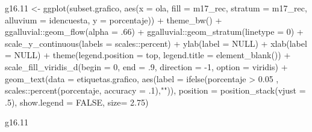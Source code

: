 \documentclass[
  12pt,
]{book}
\newenvironment{Shaded}{\begin{snugshade}}{\end{snugshade}}
\newcommand{\AttributeTok}[1]{\textcolor[rgb]{0.77,0.63,0.00}{#1}}
\newcommand{\ConstantTok}[1]{\textcolor[rgb]{0.00,0.00,0.00}{#1}}
\newcommand{\DecValTok}[1]{\textcolor[rgb]{0.00,0.00,0.81}{#1}}
\newcommand{\FloatTok}[1]{\textcolor[rgb]{0.00,0.00,0.81}{#1}}
\newcommand{\FunctionTok}[1]{\textcolor[rgb]{0.00,0.00,0.00}{#1}}
\newcommand{\NormalTok}[1]{#1}
\newcommand{\OtherTok}[1]{\textcolor[rgb]{0.56,0.35,0.01}{#1}}
\newcommand{\SpecialCharTok}[1]{\textcolor[rgb]{0.00,0.00,0.00}{#1}}
\newcommand{\StringTok}[1]{\textcolor[rgb]{0.31,0.60,0.02}{#1}}
\begin{document}
\begin{Shaded}
\begin{Highlighting}[]
\NormalTok{g16}\FloatTok{.11} \OtherTok{\textless{}{-}} \FunctionTok{ggplot}\NormalTok{(subset.grafico, }\FunctionTok{aes}\NormalTok{(}\AttributeTok{x =}\NormalTok{ ola, }\AttributeTok{fill =}\NormalTok{ m17\_rec, }\AttributeTok{stratum =}\NormalTok{ m17\_rec, }
                              \AttributeTok{alluvium =}\NormalTok{ idencuesta, }\AttributeTok{y =}\NormalTok{ porcentaje)) }\SpecialCharTok{+}
  \FunctionTok{theme\_bw}\NormalTok{() }\SpecialCharTok{+}
\NormalTok{  ggalluvial}\SpecialCharTok{::}\FunctionTok{geom\_flow}\NormalTok{(}\AttributeTok{alpha =}\NormalTok{ .}\DecValTok{66}\NormalTok{) }\SpecialCharTok{+} 
\NormalTok{  ggalluvial}\SpecialCharTok{::}\FunctionTok{geom\_stratum}\NormalTok{(}\AttributeTok{linetype =} \DecValTok{0}\NormalTok{) }\SpecialCharTok{+}
  \FunctionTok{scale\_y\_continuous}\NormalTok{(}\AttributeTok{labels =}\NormalTok{ scales}\SpecialCharTok{::}\NormalTok{percent) }\SpecialCharTok{+}
  \FunctionTok{ylab}\NormalTok{(}\AttributeTok{label =} \ConstantTok{NULL}\NormalTok{) }\SpecialCharTok{+}
  \FunctionTok{xlab}\NormalTok{(}\AttributeTok{label =} \ConstantTok{NULL}\NormalTok{) }\SpecialCharTok{+}
  \FunctionTok{theme}\NormalTok{(}\AttributeTok{legend.position =} \StringTok{\textquotesingle{}top\textquotesingle{}}\NormalTok{,}
        \AttributeTok{legend.title =} \FunctionTok{element\_blank}\NormalTok{()) }\SpecialCharTok{+}
  \FunctionTok{scale\_fill\_viridis\_d}\NormalTok{(}\AttributeTok{begin =} \DecValTok{0}\NormalTok{, }\AttributeTok{end =}\NormalTok{ .}\DecValTok{9}\NormalTok{, }\AttributeTok{direction =} \SpecialCharTok{{-}}\DecValTok{1}\NormalTok{, }\AttributeTok{option =} \StringTok{\textquotesingle{}viridis\textquotesingle{}}\NormalTok{) }\SpecialCharTok{+}
  \FunctionTok{geom\_text}\NormalTok{(}\AttributeTok{data =}\NormalTok{ etiquetas.grafico, }
            \FunctionTok{aes}\NormalTok{(}\AttributeTok{label =} \FunctionTok{ifelse}\NormalTok{(porcentaje }\SpecialCharTok{\textgreater{}} \FloatTok{0.05}\NormalTok{ , scales}\SpecialCharTok{::}\FunctionTok{percent}\NormalTok{(porcentaje, }\AttributeTok{accuracy =}\NormalTok{ .}\DecValTok{1}\NormalTok{),}\StringTok{""}\NormalTok{)),}
            \AttributeTok{position =} \FunctionTok{position\_stack}\NormalTok{(}\AttributeTok{vjust =}\NormalTok{ .}\DecValTok{5}\NormalTok{),}
            \AttributeTok{show.legend =} \ConstantTok{FALSE}\NormalTok{,}
            \AttributeTok{size=} \FloatTok{2.75}\NormalTok{)}

\NormalTok{g16}\FloatTok{.11}
\end{Highlighting}
\end{Shaded}
\end{document}
